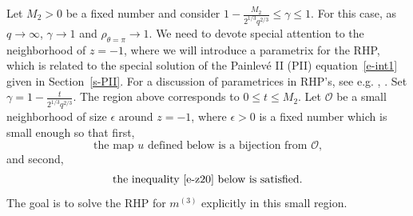 \documentclass{amsart}
\theoremstyle{definition}
\theoremstyle{remark}
\numberwithin{equation}{section}
\begin{document}
\bigskip
Let $M_2>0$ be a fixed number 
and consider $1-\frac{M_2}{2^{1/3}q^{2/3}} \le \gamma \le 1$.
For this case, as $q\to\infty$, $\gamma\to 1$ and 
$\rho_{\theta=\pi} \to 1$. 
We need to devote special attention to the neighborhood of $z=-1$, 
where we will introduce a parametrix for the RHP,  
which is related to the special solution of the Painlev\'e II (PII)
equation~\eqref{e-int1} given in Section~\ref{s-PII}.
For a discussion of parametrices in RHP's, see e.g. \cite{DZ}, \cite{DKMVZ}.
Set $\gamma=1-\frac{t}{2^{1/3}q^{2/3}}$. 
The region above corresponds to $0\le t\leq M_2$.
Let $\mathcal{O}$ be a small neighborhood of size $\epsilon$ around
$z=-1$, where $\epsilon>0$ is a fixed number which is small enough  
so that first, 
\begin{equation}\label{e-z18}
  \text{the map $u$ defined below is a bijection from $\mathcal{O}$,} 
\end{equation}
and second, 
\begin{equation}\label{e-z19}
  \text{the inequality~\eqref{e-z20} below is satisfied.}
\end{equation} 
The goal is to solve 
the RHP for $m^{(3)}$ explicitly in this small region.
\end{document}
